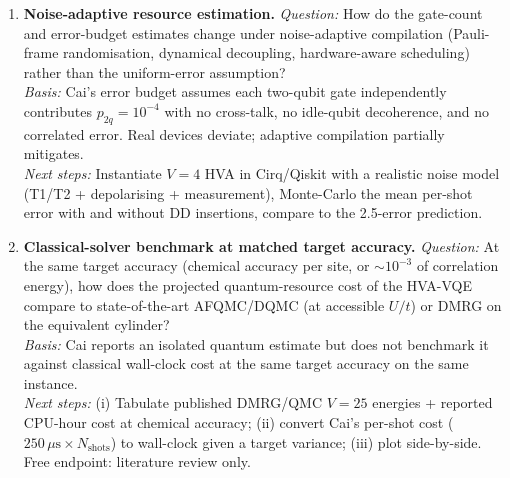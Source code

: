 \begin{enumerate}
\item \textbf{Noise-adaptive resource estimation.}
\textit{Question:} How do the gate-count and error-budget estimates change under
noise-adaptive compilation (Pauli-frame randomisation, dynamical decoupling,
hardware-aware scheduling) rather than the uniform-error assumption? \\
\textit{Basis:} Cai's error budget assumes each two-qubit gate independently contributes
$p_{2q}=10^{-4}$ with no cross-talk, no idle-qubit decoherence, and no correlated error.
Real devices deviate; adaptive compilation partially mitigates. \\
\textit{Next steps:} Instantiate $V=4$ HVA in Cirq/Qiskit with a realistic noise model
(T1/T2 + depolarising + measurement), Monte-Carlo the mean per-shot error with and
without DD insertions, compare to the 2.5-error prediction.

\item \textbf{Classical-solver benchmark at matched target accuracy.}
\textit{Question:} At the same target accuracy (chemical accuracy per site, or
$\sim 10^{-3}$ of correlation energy), how does the projected quantum-resource cost
of the HVA-VQE compare to state-of-the-art AFQMC/DQMC (at accessible $U/t$) or DMRG
on the equivalent cylinder? \\
\textit{Basis:} Cai reports an isolated quantum estimate but does not benchmark it
against classical wall-clock cost at the same target accuracy on the same instance. \\
\textit{Next steps:} (i) Tabulate published DMRG/QMC $V{=}25$ energies + reported CPU-hour
cost at chemical accuracy; (ii) convert Cai's per-shot cost ($250\,\mu\mathrm{s} \times
N_{\mathrm{shots}}$) to wall-clock given a target variance; (iii) plot side-by-side.
Free endpoint: literature review only.

\end{enumerate}
